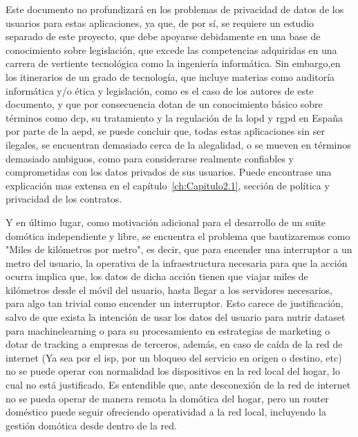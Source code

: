 \vspace{1cm}

Este documento no profundizará en los problemas de privacidad de datos de los usuarios para estas aplicaciones, ya que, de por sí, se requiere un estudio separado de este proyecto, que debe apoyarse debidamente en una base de conocimiento sobre legislación, que excede las competencias adquiridas en una carrera de vertiente tecnológica como la ingeniería informática. Sin embargo,en los itinerarios de un grado de tecnología, que incluye materias como auditoría informática y/o ética y legislación, como es el caso de los autores de este documento, y que por consecuencia dotan de un conocimiento básico sobre términos como \gls{dcp}, su tratamiento y la regulación de la \gls{lopd} y \gls{rgpd} en España por parte de la \gls{aepd}, se puede concluir que, todas estas aplicaciones sin ser ilegales, se encuentran demasiado cerca de la alegalidad, o se mueven en términos demasiado ambiguos, como para considerarse realmente confiables y comprometidas con los datos privados de sus usuarios. Puede encontrase una explicación mas extensa en el capítulo~\ref{ch:Capitulo2.1}, sección de política y privacidad de los contratos.

\vspace{1cm}

Y en último lugar, como motivación adicional para el desarrollo de un suite domótica independiente y libre, se encuentra el problema que bautizaremos como "Miles de kilómetros por metro", es decir, que para encender una interruptor a un metro del usuario, la operativa de la infraestructura necesaria para que la acción ocurra implica que, los datos de dicha acción tienen que viajar miles de kilómetros desde el móvil del usuario, hasta llegar a los servidores necesarios, para algo tan trivial como encender un interruptor. Esto carece de justificación, salvo de que exista la intención de usar los datos del usuario para nutrir \gls{dataset} para \gls{machinelearning} o para su procesamiento en estrategias de marketing o dotar de tracking a empresas de terceros, además, en caso de caída de la red de internet (Ya sea por el \gls{isp}, por un bloqueo del servicio en origen o destino, etc) no se puede operar con normalidad los dispositivos en la red local del hogar, lo cual no está justificado. Es entendible que, ante desconexión de la red de internet no se pueda operar de manera remota la domótica del hogar, pero un router doméstico puede seguir ofreciendo operatividad a la red local, incluyendo la gestión domótica desde dentro de la red.

